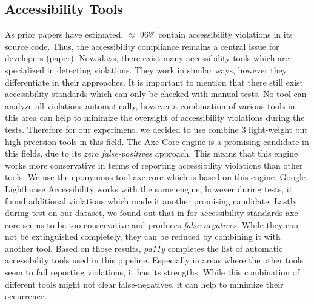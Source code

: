 \subsection{Accessibility Tools}
As prior papers have estimated, $\approx$ 96\% contain accessibility violations 
in its source code. Thus, the accessibility compliance remains a central issue for 
developers (paper). Nowadays, there exist many accessibility tools which are 
specialized in detecting violations. They work in similar ways, however they
differentiate in their approaches.
It is important to mention that there still exist accessibility standards which 
can only be checked with manual tests. No tool can analyze all violations automatically, 
however a combination of various tools in this area can help to minimize the 
oversight of accessibility violations during the tests.
Therefore for our experiment, we decided to use combine 3
light-weight but high-precision tools in this field.\newline
The Axe-Core engine is a promising candidate in this fields, due to its \textit{zero 
false-positives} approach. This means that this engine works more conservative 
in terms of reporting accessibility violations than other tools.
We use the eponymous tool axe-core which is based on this engine.\newline
Google Lighthouse Accessibility works with the same engine,
however during tests, it found additional violations which made it another promising
candidate.\newline
Lastly during test on our dataset, we found out that in for accessibility standards 
axe-core seems to be too conservative and produces \textit{false-negatives}. While 
they can not be extinguished completely, they can be reduced by combining it with 
another tool. Based on those results, \textit{pa11y} completes the list of automatic
accessibility tools used in this pipeline. Especially in areas where the other tools
seem to fail reporting violations, it has its strengths.\newline
While this combination of different tools might not clear false-negatives, it can
help to minimize their occurrence.

